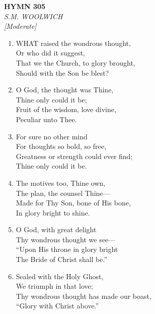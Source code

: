 \documentclass[11pt,a4paper]{article}
\begin{document}
\newpage
\begin{center}
    {\Large \textbf{HYMN 305}}
    \\
    \textit{S.M. WOOLWICH}
    \\
    \textit{\small [Moderate]}
\end{center}
\vspace{1em}

\begin{enumerate}
    \item WHAT raised the wondrous thought, \\
        Or who did it suggest, \\
        That we the Church, to glory brought, \\
        Should with the Son be blest?

    \item O God, the thought was Thine, \\
        Thine only could it be; \\
        Fruit of the wisdom, love divine, \\
        Peculiar unto Thee.

    \item For sure no other mind \\
        For thoughts so bold, so free, \\
        Greatness or strength could ever find; \\
        Thine only could it be.

    \item The motives too, Thine own, \\
        The plan, the counsel Thine--- \\
        Made for Thy Son, bone of His bone, \\
        In glory bright to shine.

    \item O God, with great delight \\
        Thy wondrous thought we see--- \\
        ``Upon His throne in glory bright \\
        The Bride of Christ shall be.''

    \item Sealed with the Holy Ghost, \\
        We triumph in that love; \\
        Thy wondrous thought has made our boast, \\
        ``Glory with Christ above.''

\end{enumerate}
\end{document}
